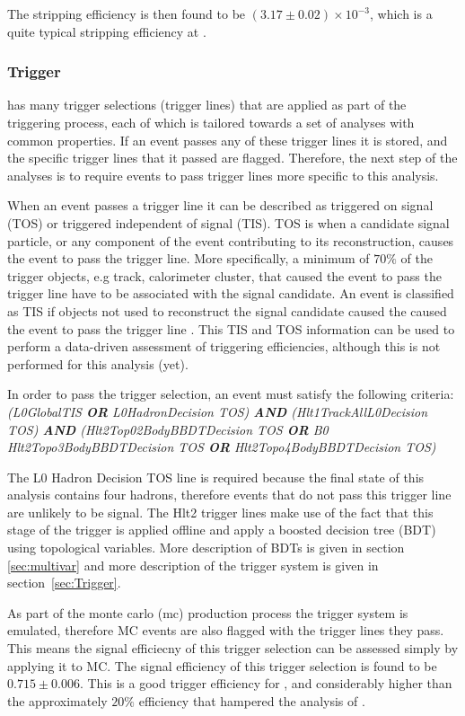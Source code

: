 The stripping efficiency is then found to be $(3.17 \pm 0.02)\times10^{-3}$, which is a quite typical stripping efficiency at \lhcb.
\clearpage
\subsubsection{Trigger}
\label{sec:trigger}
\lhcb has many trigger selections (trigger lines) that are applied as part of the triggering process, each of which is tailored towards a set of analyses with common properties. If an event passes any of these trigger lines it is stored, and the specific trigger lines that it passed are flagged.  Therefore, the next step of the analyses is to require events to pass trigger lines more specific to this analysis.

When an event passes a trigger line it can be described as triggered on signal (TOS) or triggered independent of signal (TIS).  TOS is when a candidate signal particle, or any component of the event contributing to its reconstruction, causes the event to pass the trigger line.  More specifically, a minimum of $70\%$ of the trigger objects, e.g track, calorimeter cluster, that caused the event to pass the trigger line have to be associated with the signal candidate.  An event is classified as TIS if objects not used to reconstruct the signal candidate caused the caused the event to pass the trigger line \cite{1748-0221-8-04-P04022}. This TIS and TOS information can be used to perform a data-driven assessment of triggering efficiencies, although this is not performed for this analysis (yet)\cite{Tolk:1701134}.

In order to pass the trigger selection, an event must satisfy the following criteria:
\textit{
  (L0GlobalTIS \textbf{OR} L0HadronDecision TOS) \textbf{AND} (Hlt1TrackAllL0Decision TOS) \textbf{AND} (Hlt2Top02BodyBBDTDecision TOS \textbf{OR} B0 Hlt2Topo3BodyBBDTDecision TOS \textbf{OR} Hlt2Topo4BodyBBDTDecision TOS)
}

The L0 Hadron Decision TOS line is required because the final state of this analysis contains four hadrons, therefore events that do not pass this trigger line are unlikely to be signal.  The Hlt2 trigger lines make use of the fact that this stage of the trigger is applied offline and apply a boosted decision tree (BDT) using topological variables.  More description of BDTs is given in section \ref{sec:multivar} and more description of the \lhcb trigger system is given in section~\ref{sec:Trigger}.

As part of the monte carlo (mc) production process the \lhcb trigger system is emulated, therefore MC events are also flagged with the trigger lines they pass.  This means the signal efficiecny of this trigger selection can be assessed simply by applying it to MC.  The signal efficiency of this trigger selection is found to be $0.715\pm0.006$.  This is a good trigger efficiency for \lhcb, and considerably higher than the approximately $20\%$ efficiency that hampered the analysis of \Lb \to \Lz\etaz \cite{LHCb-PAPER-2015-019}.

